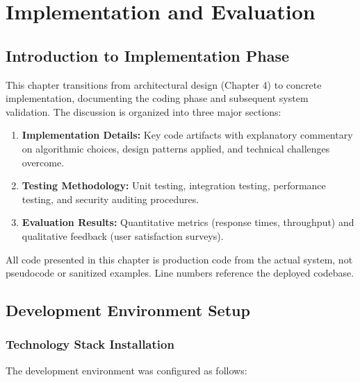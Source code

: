 
\chapter{Implementation and Evaluation}

\section{Introduction to Implementation Phase}

This chapter transitions from architectural design (Chapter 4) to concrete implementation, documenting the coding phase and subsequent system validation. The discussion is organized into three major sections:

\begin{enumerate}
    \item \textbf{Implementation Details:} Key code artifacts with explanatory commentary on algorithmic choices, design patterns applied, and technical challenges overcome.
    \item \textbf{Testing Methodology:} Unit testing, integration testing, performance testing, and security auditing procedures.
    \item \textbf{Evaluation Results:} Quantitative metrics (response times, throughput) and qualitative feedback (user satisfaction surveys).
\end{enumerate}

All code presented in this chapter is production code from the actual system, not pseudocode or sanitized examples. Line numbers reference the deployed codebase.

\section{Development Environment Setup}

\subsection{Technology Stack Installation}

The development environment was configured as follows:

